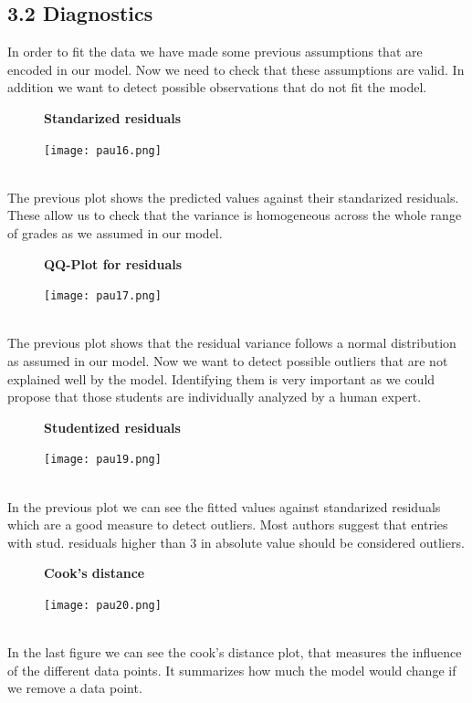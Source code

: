 \documentclass[a4paper, 11pt]{report}
\theoremstyle{definition}
\numberwithin{equation}{section}		%
\numberwithin{table}{section}				%
\begin{document}
\subsection*{3.2 Diagnostics}
In order to fit the data we have made some previous assumptions that are encoded in our model. Now we need to check that these assumptions are valid. In addition we want to detect possible observations that do not fit the model.
\begin{figure}[ht]\centering
\textbf{Standarized residuals}\par\medskip
\texttt{[image: pau16.png]}
\end{figure}
\\
The previous plot shows the predicted values against their standarized residuals. These allow us to check that the variance is homogeneous across the whole range of grades as we assumed in our model.
\begin{figure}[ht]\centering
\textbf{QQ-Plot for residuals}\par\medskip
\texttt{[image: pau17.png]}
\end{figure}
\\
The previous plot shows that the residual variance follows a normal distribution as assumed in our model.
\newpage
Now we want to detect possible outliers that are not explained well by the model. Identifying them is very important as we could propose that those students are individually analyzed by a human expert.
\begin{figure}[ht]\centering
\textbf{Studentized residuals}\par\medskip
\texttt{[image: pau19.png]}
\end{figure}
\\
In the previous plot we can see the fitted values against standarized residuals which are a good measure to detect outliers. Most authors suggest that entries with stud. residuals higher than 3 in absolute value should be considered outliers.
\begin{figure}[ht]\centering
\textbf{Cook's distance}\par\medskip
\texttt{[image: pau20.png]}
\end{figure}
\\
In the last figure we can see the cook's distance plot, that measures the influence of the different data points. It summarizes how much the model would change if we remove a data point.
\newpage
\end{document}
